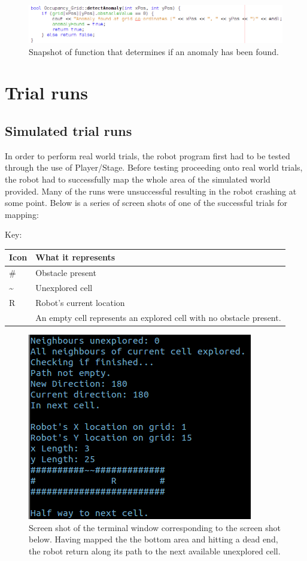 \documentclass[a4paper,12pt]{article}
\begin{document}
\begin{figure}[H]
\includegraphics[scale=0.65]{Detect_Anomaly_SS.png}
\caption{Snapshot of function that determines if an anomaly has been found.}
\end{figure}

\section{Trial runs}

\subsection{Simulated trial runs}
\noindent In order to perform real world trials, the robot program first had to be tested through the use of Player/Stage. Before testing proceeding onto real world trials, the robot had to successfully map the whole area of the simulated world provided. Many of the runs were unsuccessful resulting in the robot crashing at some point. Below is a series of screen shots of one of the successful trials for mapping:

\vspace{5mm}
\noindent Key:
\begin{table}[H]
\begin{tabular}{| l | l |}
	\hline
	\textbf{Icon} & \textbf{What it represents}
	\\\hline
	\# & Obstacle present
	\\\hline
	\textasciitilde & Unexplored cell
	\\\hline
	R & Robot's current location
	\\\hline
	 & An empty cell represents an explored cell with no obstacle present.
	\\\hline
\end{tabular}
\end{table}

\begin{figure}[H]
\includegraphics[scale=1.0]{RunT1.png}
\caption{Screen shot of the terminal window corresponding to the screen shot below. Having mapped the the bottom area and hitting a dead end, the robot return along its path to the next available unexplored cell.}
\end{figure}
\end{document}
